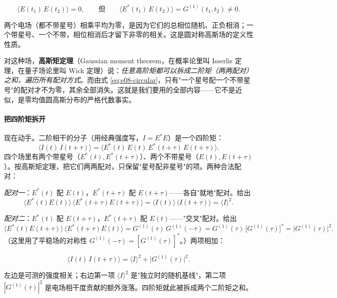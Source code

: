 \begin{equation}
  \langle E(t_1)\,E(t_2)\rangle=0,
  \qquad\text{但}\qquad
  \langle E^*(t_1)\,E(t_2)\rangle=G^{(1)}(t_1,t_2)\neq0.
  \label{eq:e08-circular}
\end{equation}
\begin{formulaexplain}
两个电场（都不带星号）相乘平均为零，是因为它们的总相位随机、正负相消；一个带星号、一个不带，相位相消后才留下非零的相关。这是圆对称高斯场的定义性性质。
\end{formulaexplain}

对这种场，\textbf{高斯矩定理}（Gaussian moment theorem，在概率论里叫 Isserlis 定理，在量子场论里叫 Wick 定理）说：\emph{任意高阶矩都可以拆成二阶矩（两两配对）之和，遍历所有配对方式}。而由式 \eqref{eq:e08-circular}，只有"一个星号配一个不带星号"的配对才不为零，其余全部消失。这就是我们要用的全部内容——它不是近似，是零均值圆高斯分布的严格代数事实。

\paragraph{把四阶矩拆开}
\label{sec:e08-factorize}

现在动手。二阶相干的分子（用经典强度写，\(I=E^*E\)）是一个四阶矩：
\[
  \big\langle I(t)\,I(t+\tau)\big\rangle
  =\big\langle E^*(t)\,E(t)\,E^*(t+\tau)\,E(t+\tau)\big\rangle .
\]
四个场里有两个带星号（\(E^*(t),E^*(t+\tau)\)）、两个不带星号（\(E(t),E(t+\tau)\)）。按高斯矩定理，把它们两两配对，只保留"星号配非星号"的项。两种合法配对：

\emph{配对一}：\(E^*(t)\) 配 \(E(t)\)，\(E^*(t+\tau)\) 配 \(E(t+\tau)\)——各自"就地"配对。给出
\[
  \langle E^*(t)E(t)\rangle\,\langle E^*(t+\tau)E(t+\tau)\rangle
  =\langle I(t)\rangle\,\langle I(t+\tau)\rangle=\langle I\rangle^2 .
\]

\emph{配对二}：\(E^*(t)\) 配 \(E(t+\tau)\)，\(E^*(t+\tau)\) 配 \(E(t)\)——"交叉"配对。给出
\[
  \langle E^*(t)E(t+\tau)\rangle\,\langle E^*(t+\tau)E(t)\rangle
  =G^{(1)}(\tau)\,G^{(1)}(-\tau)
  =G^{(1)}(\tau)\,\big[G^{(1)}(\tau)\big]^*
  =\big|G^{(1)}(\tau)\big|^2 .
\]
（这里用了平稳场的对称性 \(G^{(1)}(-\tau)=[G^{(1)}(\tau)]^*\)。）两项相加：

\begin{equation}
  \big\langle I(t)\,I(t+\tau)\big\rangle=\langle I\rangle^2+\big|G^{(1)}(\tau)\big|^2 .
  \label{eq:e08-G2-factor}
\end{equation}
\begin{formulaexplain}
左边是可测的强度相关；右边第一项 \(\langle I\rangle^2\) 是"独立时的随机基线"，第二项 \(|G^{(1)}(\tau)|^2\) 是电场相干度贡献的额外涨落。四阶矩就此被拆成两个二阶矩之和。
\end{formulaexplain}

